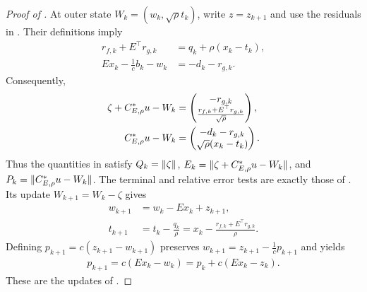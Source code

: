 \documentclass[11pt]{article}
\begin{document}
\begin{proof}[Proof of ]
    At outer state $W_k=(w_k,\sqrt{\rho}t_k)$, write $z=z_{k+1}$ and use the residuals in .
    Their definitions imply
    \begin{align}
        r_{f,k}+ E^\top r_{g,k} &=q_k+\rho(x_k-t_k),\\
        Ex_k-\frac{1}{c}b_k-w_k&=-d_k-r_{g,k}.
    \end{align}
    Consequently,
    \begin{align}
        \zeta+{C}_{E,\rho}^*u-W_k
        &=\begin{pmatrix}
            -r_{g,k}\\
            \frac{r_{f,k}+ E^\top r_{g,k}}{\sqrt{\rho}}
        \end{pmatrix},\\
        {C}_{E,\rho}^*u-W_k
        &=\begin{pmatrix}
            -d_k-r_{g,k} \\
            \sqrt{\rho}(x_k-t_k)
        \end{pmatrix}.
    \end{align}
    Thus the quantities in  satisfy
    $Q_k=\lVert\zeta\rVert$, $E_k=\lVert\zeta+{C}_{E,\rho}^*u-W_k\rVert$, and $P_k=\lVert{C}_{E,\rho}^*u-W_k\rVert$.
    The terminal and relative error tests are exactly those of .
    Its update $W_{k+1}=W_k-\zeta$ gives
    \begin{align}
        w_{k+1}&=w_k-Ex_k+z_{k+1},\\
        t_{k+1}&=t_k-\frac{q_k}{\rho}
        =x_k-\frac{r_{f,k}+ E^\top r_{g,k}}{\rho}.
    \end{align}
    Defining $p_{k+1}=c(z_{k+1}-w_{k+1})$ preserves $w_{k+1}=z_{k+1}-\frac{1}{c}p_{k+1}$ and yields
    \begin{align}
        p_{k+1}=c(Ex_k-w_k)=p_k+c(Ex_k-z_k).
    \end{align}
    These are the updates of .


\end{proof}
\end{document}
